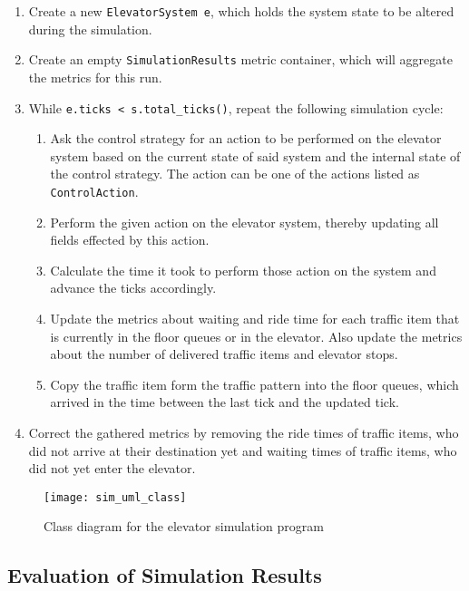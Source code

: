 \begin{enumerate}
    \item Create a new \texttt{ElevatorSystem e}, which holds the system state to be altered during the simulation.
    \item Create an empty \texttt{SimulationResults} metric container, which will aggregate the metrics for this run.
    \item While \texttt{e.ticks < s.total\_ticks()}, repeat the following simulation cycle:
    \begin{enumerate}
        \item Ask the control strategy for an action to be performed on the elevator system based on the current state of said system and the internal state of the control strategy.
        The action can be one of the actions listed as \texttt{ControlAction}.
        \item Perform the given action on the elevator system, thereby updating all fields effected by this action.
        \item Calculate the time it took to perform those action on the system and advance the ticks accordingly.
        \item Update the  metrics about waiting and ride time for each traffic item that is currently in the floor queues or in the elevator. Also update the metrics about the number of delivered traffic items and elevator stops.
        \item Copy the traffic item form the traffic pattern into the floor queues, which arrived in the time between the last tick and the updated tick.
    \end{enumerate}
    \item Correct the gathered metrics by removing the ride times of traffic items, who did not arrive at their destination yet and waiting times of traffic items, who did not yet enter the elevator.
\end{enumerate}

\begin{figure}[p]
    \centering
    \texttt{[image: sim\_uml\_class]}
    \caption{Class diagram for the elevator simulation program}
    \label{fig:impl:class}
\end{figure}



\subsection{Evaluation of Simulation Results}

